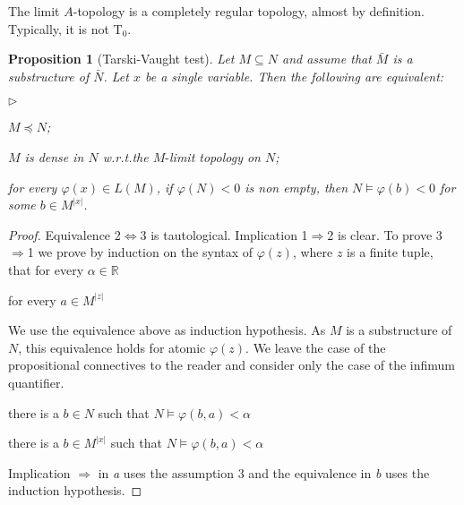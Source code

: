\documentclass[12pt,letterpaper,oneside,reqno]{amsart}
\newcommand{\mylabel}[1]{{#1}\hfill}
\renewenvironment{itemize}
  {\begin{list}{$\triangleright$}{%
   \setlength{\parskip}{0mm}
   \setlength{\topsep}{.2\baselineskip}
   \setlength{\rightmargin}{0mm}
   \setlength{\listparindent}{0mm}
   \setlength{\itemindent}{0mm}
   \setlength{\labelwidth}{3ex}
   \setlength{\itemsep}{.2\baselineskip}
   \setlength{\parsep}{.2\baselineskip}
   \setlength{\partopsep}{0mm}
   \setlength{\labelsep}{1ex}
   \setlength{\leftmargin}{\labelwidth+\labelsep}
   \let\makelabel\mylabel}}{%
   \end{list}}
\theoremstyle{plain}
\newtheorem{proposition}[theorem]{Proposition}
\newtheorem{remark}[theorem]{Remark}
\theoremstyle{remark}
\begin{document}
The limit $A$-topology is a completely regular topology, almost by definition.
Typically, it is not T$_0$.


\begin{proposition}[Tarski-Vaught test]\label{prop_Tarski-Vaught} Let $M\subseteq N$ and assume that $\bar M$ is a substructure of $\bar N$.
  Let $x$ be a single variable.
  Then the following are equivalent:
  \begin{itemize}
    \item[1.] $M\preceq N$;
    \item[2.] $M$ is dense in $N$ w.r.t.\@ the $M\mbox{-}$limit topology on $N$;
    \item[3.] for every $\varphi(x)\in L(M)$, if $\varphi(N)<0$ is non empty, then $N\models\varphi(b)<0$ for some $b\in M^{|x|}$.
  \end{itemize}
\end{proposition}
\begin{proof}
  Equivalence 2$\Leftrightarrow$3 is tautological.
  Implication 1$\Rightarrow$2 is clear.
  To prove 3$\Rightarrow$1 we prove by induction on the syntax of $\varphi(z)$, where $z$ is a finite tuple, that for every $\alpha\in{\mathds R}$

   \hfill for every $a\in M^{|z|}$

  We use the equivalence above as induction hypothesis.
  As $M$ is a substructure of $N$, this equivalence holds for atomic $\varphi(z)$.
  We leave the case of the propositional connectives to the reader and consider only the case of the infimum quantifier.

   there is a $b\in N$ such that $N\models\varphi(b,a)<\alpha$

   there is a $b\in M^{|x|}$ such that $N\models\varphi(b,a)<\alpha$


  Implication $\Rightarrow$ in \textit{a} uses the assumption 3 and the equivalence in \textit{b} uses the induction hypothesis.
\end{proof}

\end{document}
